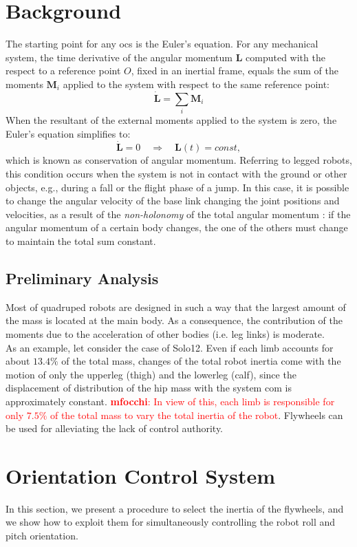 \documentclass[sensors,article,submit,pdftex,moreauthors]{Definitions/mdpi}
\newcommand{\MF}[1]{\textcolor{red}{\textbf{mfocchi}: #1}}
\begin{document}
\section{Background}
\label{sec:background}
The starting point for any \gls{ocs} is the Euler's equation. For any mechanical system, the time derivative of the angular momentum $\bm{L}$ computed with the respect to a reference point $O$, fixed in an inertial frame, equals the sum of the moments $\bm{M}_i$ applied to the system with respect to the same reference point:
\begin{equation}
\dot{\bm{L}} = \sum_i \bm{M}_i
\end{equation}
When the resultant of the external moments applied to the system is zero, the Euler's equation simplifies to:
\begin{equation}
\dot{\bm{L}} = 0 \quad \Rightarrow \quad \bm{L}(t) = const,
\label{eq:cons_ang_mom}
\end{equation}
which is known as conservation of angular momentum.
Referring to legged robots, this condition occurs when the system is not in contact with the ground or other objects, e.g., during a fall or the flight phase of a jump.
In this case, it is possible to change the angular velocity of the base link changing the joint positions and velocities, as a result of the \textit{non-holonomy} of the total angular momentum \cite{Wieber16}: if the angular momentum of a certain body changes, the one of the others must change to maintain the total sum constant.
\subsection{Preliminary Analysis}
Most of quadruped robots are designed in such a way that the largest amount of the mass is located at the main body. As a consequence, the contribution of the moments due to the acceleration of other bodies (i.e. leg links) is moderate. \\
As an example, let consider the case of Solo12. Even if each limb accounts for about $13.4\%$ of the total mass, changes of the total robot inertia come with the motion of only the upperleg (thigh) and the lowerleg (calf), since the displacement of distribution of the hip mass with the system \acrshort{com} is approximately constant. \MF{In view of this, each limb is responsible for only $7.5\%$ of the total mass to vary the total inertia of the robot}. Flywheels can be used for alleviating the lack of control authority.


\section{Orientation Control System}
\label{sec:ocs}
In this section, we present a procedure to select the inertia of the flywheels, and we show how to exploit them for simultaneously controlling the robot roll and pitch orientation.
\end{document}
